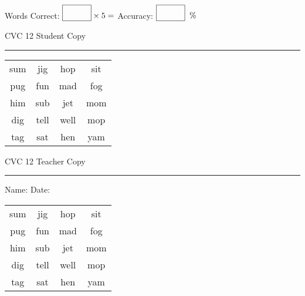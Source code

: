\documentclass{memoir}
\begin{document}
\small

Words Correct: $\fbox{\phantom{\huge 100}} \times 5 = $ Accuracy: $\fbox{\phantom{\huge 100}}\;\; \%$ 

\vfill

\newpage


\footnotesize \noindent
CVC 12 \hfill Student Copy
\smallskip
\hrule

\Large

\setlength{\tabcolsep}{14pt}
\def\arraystretch{2}

{\selectfont


\begin{vplace}[0.5]
\begin{center}
\begin{tabular}{cccc}
sum & jig & hop & sit \\
pug & fun & mad & fog \\
him & sub & jet & mom \\
dig & tell & well & mop \\
tag & sat & hen & yam \\
\end{tabular}
\end{center}
\end{vplace}

}

\newpage

\footnotesize \noindent
CVC 12 \hfill Teacher Copy
\smallskip
\hrule

\small

\vfill

\noindent
Name: \underline{\hspace{1.75in}} \hfill Date: \underline{\hspace{1in}}

\Large

{\selectfont


\begin{vplace}[0.5]
\begin{center}
\begin{tabular}{cccc}
sum & jig & hop & sit \\
pug & fun & mad & fog \\
him & sub & jet & mom \\
dig & tell & well & mop \\
tag & sat & hen & yam \\
\end{tabular}
\end{center}
\end{vplace}



}
\end{document}
